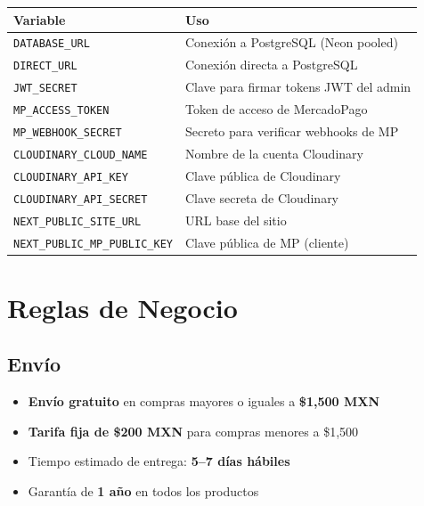 \documentclass[12pt, a4paper]{article}
\begin{document}
\begin{warnbox}
\begin{table}[H]
\centering
\small
\begin{tabularx}{\textwidth}{lX}
\toprule
\textbf{Variable} & \textbf{Uso} \\
\midrule
\texttt{DATABASE\_URL} & Conexi\'{o}n a PostgreSQL (Neon pooled) \\
\texttt{DIRECT\_URL} & Conexi\'{o}n directa a PostgreSQL \\
\texttt{JWT\_SECRET} & Clave para firmar tokens JWT del admin \\
\texttt{MP\_ACCESS\_TOKEN} & Token de acceso de MercadoPago \\
\texttt{MP\_WEBHOOK\_SECRET} & Secreto para verificar webhooks de MP \\
\texttt{CLOUDINARY\_CLOUD\_NAME} & Nombre de la cuenta Cloudinary \\
\texttt{CLOUDINARY\_API\_KEY} & Clave p\'{u}blica de Cloudinary \\
\texttt{CLOUDINARY\_API\_SECRET} & Clave secreta de Cloudinary \\
\texttt{NEXT\_PUBLIC\_SITE\_URL} & URL base del sitio \\
\texttt{NEXT\_PUBLIC\_MP\_PUBLIC\_KEY} & Clave p\'{u}blica de MP (cliente) \\
\bottomrule
\end{tabularx}
\end{table}
\end{warnbox}

\section{Reglas de Negocio}

\subsection{Env\'{i}o}

\begin{itemize}[nosep]
    \item \textbf{Env\'{i}o gratuito} en compras mayores o iguales a \textbf{\$1,500 MXN}
    \item \textbf{Tarifa fija de \$200 MXN} para compras menores a \$1,500
    \item Tiempo estimado de entrega: \textbf{5--7 d\'{i}as h\'{a}biles}
    \item Garant\'{i}a de \textbf{1 a\~{n}o} en todos los productos
\end{itemize}
\end{document}
